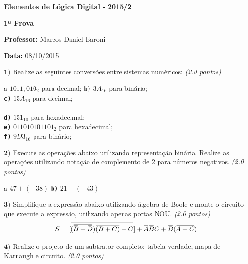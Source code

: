 \documentclass[12pt]{article}
\newcommand{\exerc}[3]{ \vspace*{25pt} {$\mathbf{#1)}$} #2 \hfill {\it #3} }
\newcommand{\exitem}[2]{ \texttt{\bf #1)} #2 \\ }
\newcommand*\xor{\mathbin{\oplus}}
\renewcommand{\neg}[1]{ 
  \mkern 1.5mu\overline{\mkern-1.5mu#1\mkern-1.5mu}\mkern 1.5mu
}
\newenvironment{exitems}[1]{
\\
\hspace*{30pt}
\begin{minipage}{0.8\textwidth}
\begin{multicols}{#1} 
}{
\end{multicols}
\end{minipage}
}
\begin{document}

\begin{center}
{\Large \bf Elementos de Lógica Digital - 2015/2}
\end{center}

{\large \bf 1ª Prova}

{\bf Professor:} Marcos Daniel Baroni

{\bf Data:} 08/10/2015


\exerc{1}{Realize as seguintes conversões entre sistemas numéricos:}{(2.0 pontos)}
\begin{exitems}{2}
	\exitem{a}{ $1011,010_2$ para decimal;}
	\exitem{b}{ $3A_{16}$ para binário;}
	\exitem{c}{ $15A_{16}$ para decimal;}
	\\
	\exitem{d}{ $151_{10}$ para hexadecimal;}
	\exitem{e}{ $0110 1010 1101_{2}$ para hexadecimal;}
	\exitem{f}{ $9D3_{16}$ para binário;}
\end{exitems}

\exerc{2}{Execute as operações abaixo utilizando representação binária. Realize as operações utilizando notação de complemento de 2 para números negativos.}{(2.0 pontos)}
\begin{exitems}{2}
	\exitem{a}{ $47 + (-38)$}
	\exitem{b}{ $21 + (-43)$}
\end{exitems}

\exerc{3}{Simplifique a expressão abaixo utilizando álgebra de Boole e monte o circuito que execute a expressão, utilizando apenas portas NOU.}{(2.0 pontos)}
\begin{displaymath}
		S = [\neg{ (\neg{\neg{B} + \neg{D}})\neg{(B + C)}+ C}] + \neg{A}\neg{B}C + \neg{B}(\neg{A+C})
\end{displaymath}

\exerc{4}{Realize o projeto de um subtrator completo: tabela verdade, mapa de Karnaugh e circuito.}{(2.0 pontos)}
\end{document}
